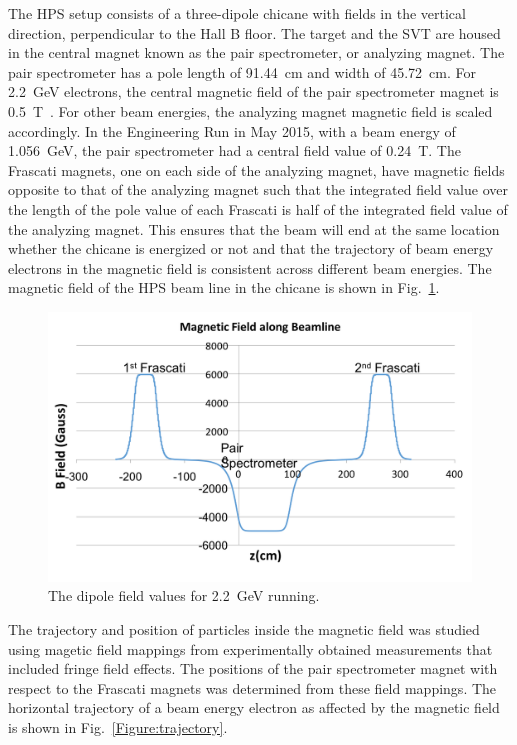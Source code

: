 The HPS setup consists of a three-dipole chicane with fields in the vertical direction, perpendicular to the Hall B floor. The target and the SVT are housed in the central magnet known as the pair spectrometer, or analyzing magnet. The pair spectrometer has a pole length of 91.44~cm and width of 45.72~cm. For 2.2~GeV electrons, the central magnetic field of the pair spectrometer magnet is 0.5~T~\cite{beamline_nim_2017}. For other beam energies, the analyzing magnet magnetic field is scaled accordingly. In the Engineering Run in May 2015, with a beam energy of 1.056~GeV, the pair spectrometer had a central field value of 0.24~T. The Frascati magnets, one on each side of the analyzing magnet, have magnetic fields opposite to that of the analyzing magnet such that the integrated field value over the length of the pole value of each Frascati is half of the integrated field value of the analyzing magnet. This ensures that the beam will end at the same location whether the chicane is energized or not and that the trajectory of beam energy electrons in the magnetic field is consistent across different beam energies. The magnetic field of the HPS beam line in the chicane is shown in Fig.~\ref{Figure:bField}.

\begin{figure}[H]
  \centering
      \includegraphics[width=1.0\textwidth]{pics/experiment/bfield.png}
  \caption[HPS magnetic fields]{The dipole field values for 2.2~GeV running.}
  \label{Figure:bField}
\end{figure}

The trajectory and position of particles inside the magnetic field was studied using magetic field mappings from experimentally obtained measurements that included fringe field effects. The positions of the pair spectrometer magnet with respect to the Frascati magnets was determined from these field mappings. The horizontal trajectory of a beam energy electron as affected by the magnetic field is shown in Fig.~\ref{Figure:trajectory}.

